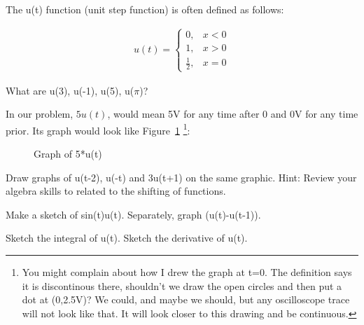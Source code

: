 The u(t) function (unit step function) is often defined as follows:

\begin{align}
u(t)=\begin{cases}
0,&\text{$x<0$}\\
1,&\text{$x>0$}\\
\frac{1}{2},&\text{$x=0$}
\end{cases}
\end{align}

\begin{alevel}
What are u(3), u(-1), u(5), u($\pi$)?
\end{alevel}

In our problem, $5u(t)$, would mean 5V for any time after 0 and 0V for any time prior. Its graph would look like Figure~\ref{F:6UT} \footnote{You might complain about how I drew the graph at t=0. The definition says it is discontinous there, shouldn't we draw the open circles and then put a dot at (0,2.5V)? We could, and maybe we should, but any oscilloscope trace will not look like that. It will look closer to this drawing and be continuous.}:

\begin{figure}[H]
\begin{center}
\caption{Graph of 5*u(t)}
\label{F:6UT}
\end{center}
\end{figure}

\begin{blevel}
Draw graphs of u(t-2), u(-t) and 3u(t+1) on the same graphic. Hint: Review your algebra skills to related to the shifting of functions.
\end{blevel}

\begin{clevel}
Make a sketch of sin(t)u(t). Separately, graph (u(t)-u(t-1)).
\end{clevel}

\begin{dlevel}
Sketch the integral of u(t). Sketch the derivative of u(t).
\end{dlevel}


